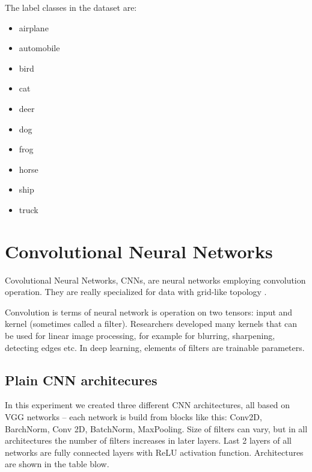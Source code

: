 \documentclass{article}
\begin{document}
\newpage
The label classes in the dataset are:

\begin{multicols}{2}
    \begin{itemize}
        \item airplane
        \item automobile
        \item bird
        \item cat
        \item deer 
        \item dog
        \item frog 
        \item horse
        \item ship
        \item truck
    \end{itemize}
\end{multicols}



\section{Convolutional Neural Networks}

Covolutional Neural Networks, CNNs, are neural networks employing convolution operation. They are really specialized for data with grid-like topology \cite{deeplearning}. 

Convolution is terms of neural network is operation on two tensors: input and kernel (sometimes called a filter). Researchers developed many kernels that can be used for linear image processing, for example for blurring, sharpening, detecting edges etc. In deep learning, elements of filters are trainable parameters. 


\subsection{Plain CNN architecures}
In this experiment we created three different CNN architectures, all based on VGG networks \cite{vgg} -- each network is build from blocks like this: Conv2D, BarchNorm, Conv 2D, BatchNorm, MaxPooling. Size of filters can vary, but in all architectures the number of filters increases in later layers. Last 2 layers of all networks are fully connected layers with ReLU activation function. Architectures are shown in the table blow. 
\end{document}
